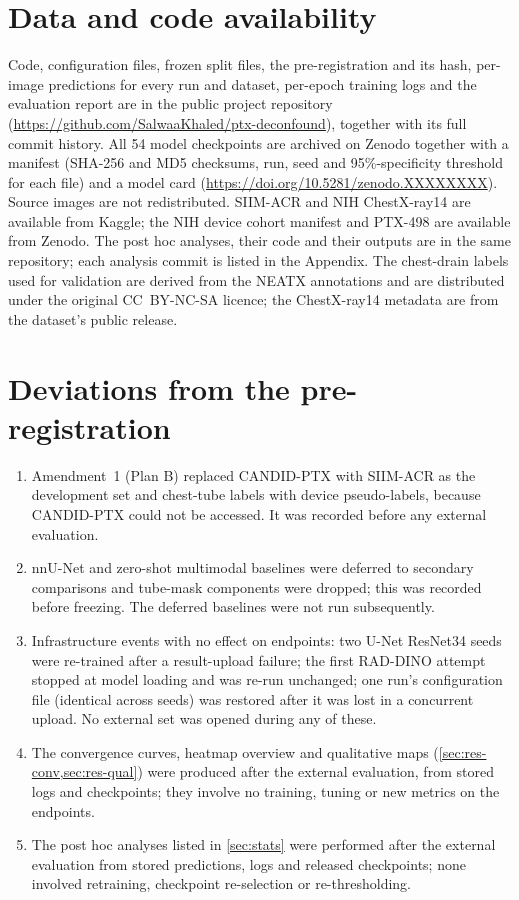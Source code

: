 \documentclass{ieeeaccess}
\newcommand{\zenodoDOI}{10.5281/zenodo.XXXXXXXX}%
\begin{document}
\section*{Data and code availability}
Code, configuration files, frozen split files, the pre-registration and its hash, per-image predictions for every run and dataset, per-epoch training logs and the evaluation report are in the public project repository (\url{https://github.com/SalwaaKhaled/ptx-deconfound}), together with its full commit history. All 54 model checkpoints are archived on Zenodo together with a manifest (SHA-256 and MD5 checksums, run, seed and 95\%-specificity threshold for each file) and a model card (\url{https://doi.org/\zenodoDOI}). Source images are not redistributed. SIIM-ACR and NIH ChestX-ray14 are available from Kaggle; the NIH device cohort manifest \cite{zamora2026cohort} and PTX-498 \cite{wang2021ptx498} are available from Zenodo. The post hoc analyses, their code and their outputs are in the same repository; each analysis commit is listed in the Appendix. The chest-drain labels used for validation are derived from the NEATX annotations \cite{jimenez2023shortcuts} and are distributed under the original CC~BY-NC-SA licence; the ChestX-ray14 metadata are from the dataset's public release.

\section*{Deviations from the pre-registration}
\begin{enumerate}
  \item Amendment~1 (Plan B) replaced CANDID-PTX with SIIM-ACR as the development set and chest-tube labels with device pseudo-labels, because CANDID-PTX could not be accessed. It was recorded before any external evaluation.
  \item nnU-Net and zero-shot multimodal baselines were deferred to secondary comparisons and tube-mask components were dropped; this was recorded before freezing. The deferred baselines were not run subsequently.
  \item Infrastructure events with no effect on endpoints: two U-Net ResNet34 seeds were re-trained after a result-upload failure; the first RAD-DINO attempt stopped at model loading and was re-run unchanged; one run's configuration file (identical across seeds) was restored after it was lost in a concurrent upload. No external set was opened during any of these.
  \item The convergence curves, heatmap overview and qualitative maps (\cref{sec:res-conv,sec:res-qual}) were produced after the external evaluation, from stored logs and checkpoints; they involve no training, tuning or new metrics on the endpoints.
  \item The post hoc analyses listed in \cref{sec:stats} were performed after the external evaluation from stored predictions, logs and released checkpoints; none involved retraining, checkpoint re-selection or re-thresholding.
\end{enumerate}
\end{document}
